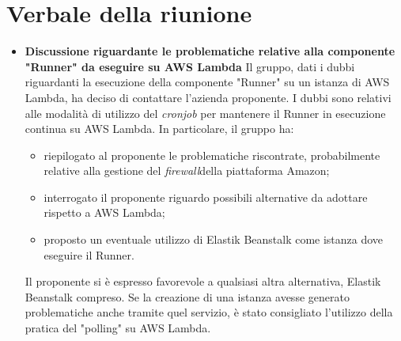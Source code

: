 \section{Verbale della riunione}
	\begin{itemize}
		\item \textbf{Discussione riguardante le problematiche relative alla componente "Runner" da eseguire su AWS Lambda}
		Il gruppo, dati i dubbi riguardanti la esecuzione della componente "Runner" su un istanza di AWS Lambda, ha deciso di contattare l'azienda proponente. I dubbi sono relativi alle modalità di utilizzo del \textit{cronjob\glo} per mantenere il Runner in esecuzione continua su AWS Lambda. In particolare, il gruppo ha:
		\begin{itemize}
			\item riepilogato al proponente le problematiche riscontrate, probabilmente relative alla gestione del \textit{firewall}\glo della piattaforma Amazon;
			\item interrogato il proponente riguardo possibili alternative da adottare rispetto a AWS Lambda;
			\item proposto un eventuale utilizzo di Elastik Beanstalk come istanza dove eseguire il Runner.
		\end{itemize}
		Il proponente si è espresso favorevole a qualsiasi altra alternativa, Elastik Beanstalk compreso. Se la creazione di una istanza avesse generato problematiche anche tramite quel servizio, è stato consigliato l'utilizzo della pratica del "polling" su AWS Lambda.
	\end{itemize}
